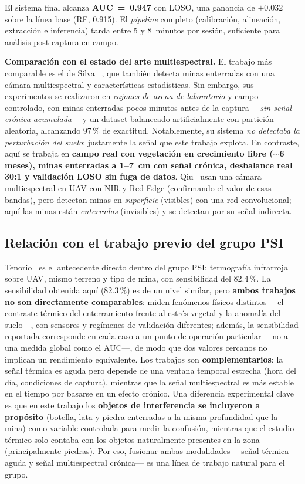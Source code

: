 El sistema final alcanza \textbf{AUC~=~0.947} con \ac{LOSO}, una ganancia de
$+0.032$ sobre la línea base (\ac{RF}, 0.915). El \emph{pipeline} completo
(calibración, alineación, extracción e inferencia) tarda entre 5 y 8~minutos por
sesión, suficiente para análisis post-captura en campo.

\textbf{Comparación con el estado del arte multiespectral.} El trabajo más
comparable es el de Silva~\etal{} \cite{silva2019}, que también detecta minas
enterradas con una cámara multiespectral y características estadísticas. Sin
embargo, sus experimentos se realizaron en \emph{cajones de arena de laboratorio}
y campo controlado, con minas enterradas pocos minutos antes de la captura
---\emph{sin señal crónica acumulada}--- y un dataset balanceado artificialmente
con partición aleatoria, alcanzando 97\,\% de exactitud. Notablemente, su sistema
\emph{no detectaba la perturbación del suelo}: justamente la señal que este
trabajo explota. En contraste, aquí se trabaja en \textbf{campo real con
vegetación en crecimiento libre ($\sim$6 meses), minas enterradas a 1--7~cm con
señal crónica, desbalance real 30:1 y validación \ac{LOSO} sin fuga de datos}.
Qiu~\etal{} \cite{qiu2023} usan una cámara multiespectral en \ac{UAV} con
\ac{NIR} y Red Edge (confirmando el valor de esas bandas), pero detectan minas en
\emph{superficie} (visibles) con una red convolucional; aquí las minas están
\emph{enterradas} (invisibles) y se detectan por su señal indirecta.

\subsection{Relación con el trabajo previo del grupo PSI}

Tenorio~\etal{} \cite{tenorio2024} es el antecedente directo dentro del grupo
\ac{PSI}: termografía infrarroja sobre \ac{UAV}, mismo terreno y tipo de mina,
con sensibilidad del 82.4\,\%. La sensibilidad obtenida aquí (82.3\,\%) es de un
nivel similar, pero \textbf{ambos trabajos no son directamente comparables}: miden
fenómenos físicos distintos ---el contraste térmico del enterramiento frente al
estrés vegetal y la anomalía del suelo---, con sensores y regímenes de validación
diferentes; además, la sensibilidad reportada corresponde en cada caso a un punto
de operación particular ---no a una medida global como el \ac{AUC}---, de modo que
dos valores cercanos no implican un rendimiento equivalente.
Los trabajos son \textbf{complementarios}: la señal térmica es aguda pero
depende de una ventana temporal estrecha (hora del día, condiciones de captura),
mientras que la señal multiespectral es más estable en el tiempo por basarse en un
efecto crónico. Una diferencia experimental clave es
que en este trabajo los \textbf{objetos de interferencia se incluyeron a
propósito} (botella, lata y piedra enterradas a la misma profundidad que la mina)
como variable controlada para medir la confusión, mientras que el estudio térmico
solo contaba con los objetos naturalmente presentes en la zona (principalmente
piedras). Por eso, fusionar ambas modalidades ---señal térmica aguda y señal
multiespectral crónica--- es una línea de trabajo natural para el grupo.
